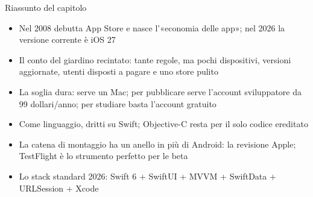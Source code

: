 \begin{tcbsummary}{Riassunto del capitolo}
\begin{itemize}
  \item Nel 2008 debutta App Store e nasce l'«economia delle app»; nel 2026 la versione corrente è iOS 27
  \item Il conto del giardino recintato: tante regole, ma pochi dispositivi, versioni aggiornate, utenti disposti a pagare e uno store pulito
  \item La soglia dura: serve un Mac; per pubblicare serve l'account sviluppatore da 99 dollari/anno; per studiare basta l'account gratuito
  \item Come linguaggio, dritti su Swift; Objective-C resta per il solo codice ereditato
  \item La catena di montaggio ha un anello in più di Android: la revisione Apple; TestFlight è lo strumento perfetto per le beta
  \item Lo stack standard 2026: Swift 6 + SwiftUI + MVVM + SwiftData + URLSession + Xcode
\end{itemize}

\end{tcbsummary}
